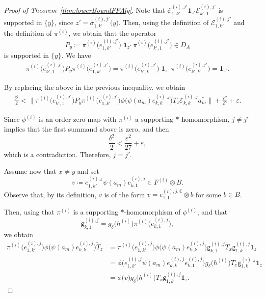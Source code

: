 \documentclass[a4paper]{amsart}
\newcommand{\myhyp}{\textnormal{-}\hskip0pt\relax}
\numberwithin{equation}{section}
\newcommand{\C}{\mathbb{C}}
\newcommand{\Ecal}{\mathcal{E}}
\newcommand{\e}{\varepsilon}
\newcommand{\indF}{\mathbf{1}}
\newcommand{\prn}[1]{{(#1)}}
\newcommand{\normBig}[1]{{\Big\lVert #1 \Big \rVert}}
\newcommand{\unMatImg}[3]{{\Ecal_{#3}^{(#1), #2}}}
\newcommand{\gUnMatImg}[3]{{ \mathsf{g}_{#3}^{(#1), #2}}}
\theoremstyle{plain}
\theoremstyle{indented}
\numberwithin{equation}{section}
\theoremstyle{definition}
\theoremstyle{remark}
\theoremstyle{plain}
\theoremstyle{definition}
\begin{document}
\begin{proof}[Proof of Theorem~\ref{thm:lowerBoundFPAlg}]
        Note that
        ${\unMatImg{i}{j'}{1,k'} \indF_{z'} \unMatImg{i}{j'}{k',1}}$
        is supported in $\{y\}$,
        since ${z' = \overline{\sigma}_{1,k'}^{(i),j'}\big(y \big)}$.
        Then, using the definition of ${\unMatImg{i}{j'}{1,k'}}$
    and the definition of $\pi^{(i)}$, we obtain that the operator
    \begin{equation*}
        P_y \coloneq \pi^{(i)}\big(e^{\prn{i},j'}_{1,k'} \big) \; \indF_{z'} \;\pi^{(i)}\big(e^{\prn{i},j'}_{k',1} \big) \in D_A 
    \end{equation*}
    is supported in $\{y\}$.
    We have
    \begin{align*}
        \pi^{(i)}\big(e^{\prn{i},j'}_{k',1} \big)  P_y \pi^{(i)}\big(e^{\prn{i},j'}_{1,k'} \big)
        = \pi^{(i)}\big(e^{\prn{i},j'}_{k',k'} \big) \; \indF_{z' } \;\pi^{(i)}\big(e^{\prn{i},j'}_{k',k'} \big) 
        = 
        \indF_{z'}.
    \end{align*}

        By replacing the above in the previous inequality, we obtain
        \begin{align} \label{ineq:xNEyIneq}
          \frac{\delta^2}{2}
           <  \normBig{\pi^{(i)}\big(e^{\prn{i},j'}_{k',1} \big)  P_y \pi^{(i)}\big(e^{\prn{i},j'}_{1,k'} \big) {\phi}\big({\psi}(a_m) e_{k,k}^{(i),j} \big)   \widetilde{T}_{z} \unMatImg{i}{j}{k,k} a_m^\ast} + \frac{\e^2}{27} +\e.
        \end{align}

        Since $\phi^{(i)}$ is an order zero map with $\pi^{\prn{i}}$ a supporting $\ast$\myhyp{}homomorphism,
        ${j \ne j'}$ 
        implies that the first summand above is zero, and then
        \[\frac{\delta^2}{2}
          < \frac{\e^2}{27} +\e,\]
        which is a contradiction. 
        Therefore, $j=j'$.

        Assume now that ${x \ne y}$ and
        set 
        \[v \coloneq e^{{(i)},{j}}_{1,k'} \psi(a_m) e^{{(i)},{j}}_{k,1} \in F^{\prn{i}} \otimes B.\] 
        Observe that, by its definition,
        $v$ is of the form ${v = e^{{(i)},{j},\C}_{1,1} \otimes b}$ for some ${b \in B}$.
        
        Then, 
        using that ${\pi^{\prn{i}}}$ is a supporting $\ast$\myhyp{}homomorphism of $\phi^{(i)}$, 
        and that 
        \[\gUnMatImg{i}{j}{k,1} =g_\delta\big(h^{(i)} \big) \pi^{(i)}\big(e^{{(i)},{j}}_{k,1}\big),\]
        we obtain
        \begin{align*}
            \pi^{(i)}\big(e^{\prn{i},j}_{1,k'} \big) {\phi}\big({\psi}(a_m) e_{k,k}^{(i),j} \big)   \widetilde{T}_{z}
            & = \pi^{(i)}\big(e^{\prn{i},j}_{1,k'} \big) {\phi}\big({\psi}(a_m) e_{k,k}^{(i),j} \big)    \gUnMatImg{i}{j}{k,1} T_x \gUnMatImg{i}{j}{1,k}  \indF_{z}\\
            & =  {\phi}\big( e^{\prn{i},j}_{1,k'} {\psi}(a_m) e_{k,k}^{(i),j} e^{\prn{i},j}_{k,1} \big)   g_\delta\big(h^{(i)}\big) T_x \gUnMatImg{i}{j}{1,k}  \indF_{z}\\
           &  =  {\phi}\big( v \big)   g_\delta\big(h^{(i)}\big) T_x \gUnMatImg{i}{j}{1,k}  \indF_{z}.
        \end{align*}
    

\end{proof}
\end{document}
